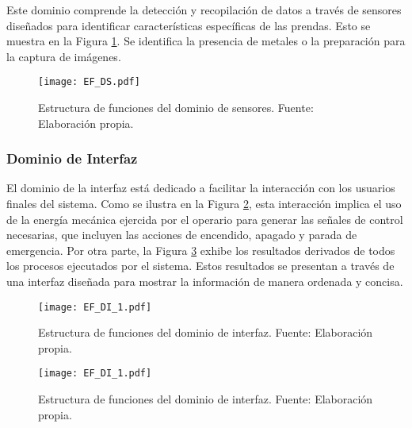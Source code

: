 Este dominio comprende la detección y recopilación de datos a través de sensores diseñados para identificar características específicas de las prendas. Esto se muestra en la Figura \ref{fig:EF_DS}. Se identifica la presencia de metales o la preparación para la captura de imágenes.

\begin{figure}[H]
	\centering
	\texttt{[image: EF\_DS.pdf]}
	\caption[Estructura de funciones del dominio de sensores.]{Estructura de funciones del dominio de sensores. Fuente: Elaboración propia.}
	\label{fig:EF_DS}
\end{figure}

\subsubsection{Dominio de Interfaz}

El dominio de la interfaz está dedicado a facilitar la interacción con los usuarios finales del sistema. Como se ilustra en la Figura \ref{fig:EF_DI_1}, esta interacción implica el uso de la energía mecánica ejercida por el operario para generar las señales de control necesarias, que incluyen las acciones de encendido, apagado y parada de emergencia. Por otra parte, la Figura \ref{fig:EF_DI_2} exhibe los resultados derivados de todos los procesos ejecutados por el sistema. Estos resultados se presentan a través de una interfaz diseñada para mostrar la información de manera ordenada y concisa.

\begin{figure}[H]
	\centering
	\texttt{[image: EF\_DI\_1.pdf]}
	\caption[Estructura de funciones del dominio de interfaz.]{Estructura de funciones del dominio de interfaz. Fuente: Elaboración propia.}
	\label{fig:EF_DI_1}
\end{figure}

\begin{figure}[H]
	\centering
	\texttt{[image: EF\_DI\_1.pdf]}
	\caption[Estructura de funciones del dominio de interfaz.]{Estructura de funciones del dominio de interfaz. Fuente: Elaboración propia.}
	\label{fig:EF_DI_2}
\end{figure}